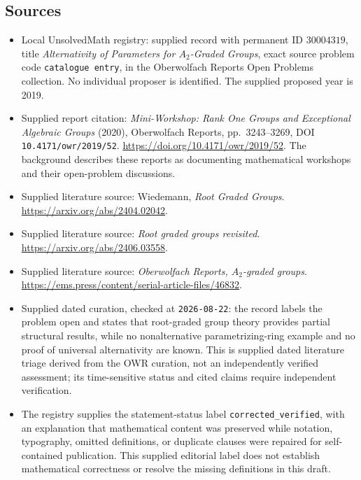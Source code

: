 \documentclass[11pt]{article}
\begin{document}
\subsection{Sources}
\begin{itemize}
\item Local UnsolvedMath registry: supplied record with permanent ID \(30004319\), title \emph{Alternativity of Parameters for \(A_2\)-Graded Groups}, exact source problem code \texttt{catalogue entry}, in the Oberwolfach Reports Open Problems collection. No individual proposer is identified. The supplied proposed year is 2019.
\item Supplied report citation: \emph{Mini-Workshop: Rank One Groups and Exceptional Algebraic Groups} (2020), Oberwolfach Reports, pp.~3243--3269, DOI \texttt{10.4171/owr/2019/52}. \url{https://doi.org/10.4171/owr/2019/52}. The background describes these reports as documenting mathematical workshops and their open-problem discussions.
\item Supplied literature source: Wiedemann, \emph{Root Graded Groups}. \url{https://arxiv.org/abs/2404.02042}.
\item Supplied literature source: \emph{Root graded groups revisited}. \url{https://arxiv.org/abs/2406.03558}.
\item Supplied literature source: \emph{Oberwolfach Reports, \(A_2\)-graded groups}. \url{https://ems.press/content/serial-article-files/46832}.
\item Supplied dated curation, checked at \texttt{2026-08-22}: the record labels the problem open and states that root-graded group theory provides partial structural results, while no nonalternative parametrizing-ring example and no proof of universal alternativity are known. This is supplied dated literature triage derived from the OWR curation, not an independently verified assessment; its time-sensitive status and cited claims require independent verification.
\item The registry supplies the statement-status label \texttt{corrected\_verified}, with an explanation that mathematical content was preserved while notation, typography, omitted definitions, or duplicate clauses were repaired for self-contained publication. This supplied editorial label does not establish mathematical correctness or resolve the missing definitions in this draft.
\end{itemize}
\end{document}
